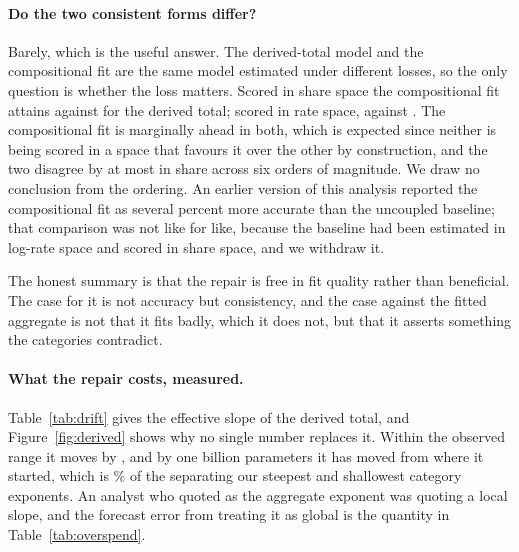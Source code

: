 \documentclass[11pt]{article}
\begin{document}
\paragraph{Do the two consistent forms differ?}
Barely, which is the useful answer. The derived-total model and the compositional
fit are the same model estimated under different losses, so the only question is
whether the loss matters. Scored in share space the compositional fit attains
 against  for the derived total; scored
in rate space,  against . The compositional
fit is marginally ahead in both, which is expected since neither is being scored in
a space that favours it over the other by construction, and the two disagree by at
most  in share across six orders of magnitude. We draw no
conclusion from the ordering. An earlier version of this analysis reported the
compositional fit as several percent more accurate than the uncoupled baseline; that
comparison was not like for like, because the baseline had been estimated in
log-rate space and scored in share space, and we withdraw it.

The honest summary is that the repair is free in fit quality rather than beneficial.
The case for it is not accuracy but consistency, and the case against the fitted
aggregate is not that it fits badly, which it does not, but that it asserts
something the categories contradict.

\paragraph{What the repair costs, measured.}
Table~\ref{tab:drift} gives the effective slope of the derived total, and
Figure~\ref{fig:derived} shows why no single number replaces it. Within the observed
range it moves by , and by one billion parameters it
has moved  from where it started, which is \%
of the  separating our steepest and shallowest category exponents.
An analyst who quoted  as the aggregate exponent was quoting a
local slope, and the forecast error from treating it as global is the quantity in
Table~\ref{tab:overspend}.
\end{document}
